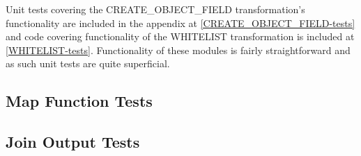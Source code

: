 Unit tests covering the CREATE\_OBJECT\_FIELD transformation's functionality are included in the appendix at \ref{CREATE_OBJECT_FIELD-tests} and code covering functionality of the WHITELIST transformation is included at \ref{WHITELIST-tests}. Functionality of these modules is fairly straightforward and as such unit tests are quite superficial.

\subsection{Map Function Tests}

\subsection{Join Output Tests}